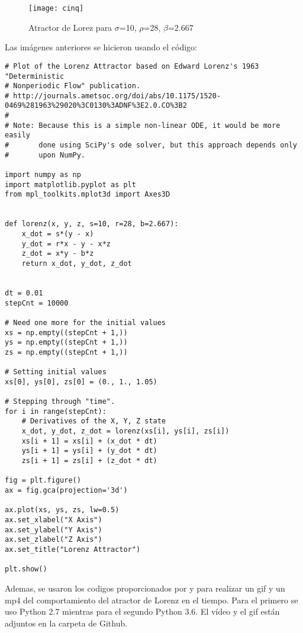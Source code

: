 \documentclass[12pt,letterpaper]{article}
\begin{document}
\begin{figure}[H]
	\centering
	\texttt{[image: cinq]}
	\caption{Atractor de Lorez para $\sigma$=10, $\rho$=28, $\beta$=2.667}
\end{figure}

Las imágenes anteriores se hicieron usando el código:
\begin{verbatim}
# Plot of the Lorenz Attractor based on Edward Lorenz's 1963 "Deterministic
# Nonperiodic Flow" publication.
# http://journals.ametsoc.org/doi/abs/10.1175/1520-0469%281963%29020%3C0130%3ADNF%3E2.0.CO%3B2
#
# Note: Because this is a simple non-linear ODE, it would be more easily
#       done using SciPy's ode solver, but this approach depends only
#       upon NumPy.

import numpy as np
import matplotlib.pyplot as plt
from mpl_toolkits.mplot3d import Axes3D


def lorenz(x, y, z, s=10, r=28, b=2.667):
    x_dot = s*(y - x)
    y_dot = r*x - y - x*z
    z_dot = x*y - b*z
    return x_dot, y_dot, z_dot


dt = 0.01
stepCnt = 10000

# Need one more for the initial values
xs = np.empty((stepCnt + 1,))
ys = np.empty((stepCnt + 1,))
zs = np.empty((stepCnt + 1,))

# Setting initial values
xs[0], ys[0], zs[0] = (0., 1., 1.05)

# Stepping through "time".
for i in range(stepCnt):
    # Derivatives of the X, Y, Z state
    x_dot, y_dot, z_dot = lorenz(xs[i], ys[i], zs[i])
    xs[i + 1] = xs[i] + (x_dot * dt)
    ys[i + 1] = ys[i] + (y_dot * dt)
    zs[i + 1] = zs[i] + (z_dot * dt)

fig = plt.figure()
ax = fig.gca(projection='3d')

ax.plot(xs, ys, zs, lw=0.5)
ax.set_xlabel("X Axis")
ax.set_ylabel("Y Axis")
ax.set_zlabel("Z Axis")
ax.set_title("Lorenz Attractor")

plt.show()
\end{verbatim}


Ademas, se usaron los codigos proporcionados por \cite{d} y \cite{e} para realizar un gif y un mp4 del comportamiento del atractor de Lorenz en el tiempo. Para el primero se uso Python 2.7 mientras para el segundo Python 3.6. El vídeo y el gif están adjuntos en la carpeta de Github.

\end{document}
